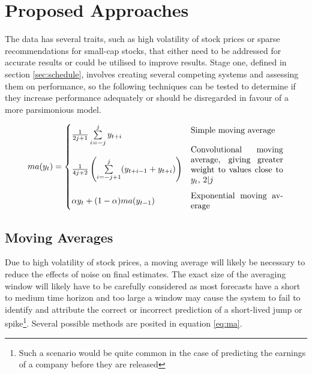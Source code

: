 \section{Proposed Approaches}\label{sec:plan}
The data has several traits, such as high volatility of stock prices or sparse recommendations for small-cap stocks, that either need to be addressed for accurate results or could be utilised to improve results. Stage one, defined in section \ref{sec:schedule}, involves creating several competing systems and assessing them on performance, so the following techniques can be tested to determine if they increase performance adequately or should be disregarded in favour of a more parsimonious model.

\begin{equation}
    ma(y_t) = \begin{cases}
    \frac{1}{2j+1} \sum\limits_{i=-j}^j y_{t+i} & \parbox{11em}{Simple moving average\\}\\
    \frac{1}{4j+2}\left(\sum\limits_{i=-j+1}^j (y_{t+i-1} + y_{t+i})\right) & \parbox{11em}{Convolutional moving average, giving greater weight to values close to $y_t$, $2|j$\\}\\
    \alpha y_t + (1-\alpha)ma(y_{t-1}) & \parbox{11em}{Exponential moving average}
    \end{cases}\label{eq:ma}
\end{equation}

\subsection{Moving Averages}
Due to high volatility of stock prices, a moving average will likely be necessary to reduce the effects of noise on final estimates. The exact size of the averaging window will likely have to be carefully considered as most forecasts have a short to medium time horizon and too large a window may cause the system to fail to identify and attribute the correct or incorrect prediction of a short-lived jump or spike\footnote{Such a scenario would be quite common in the case of predicting the earnings of a company before they are released}. Several possible methods are posited in equation \ref{eq:ma}.



